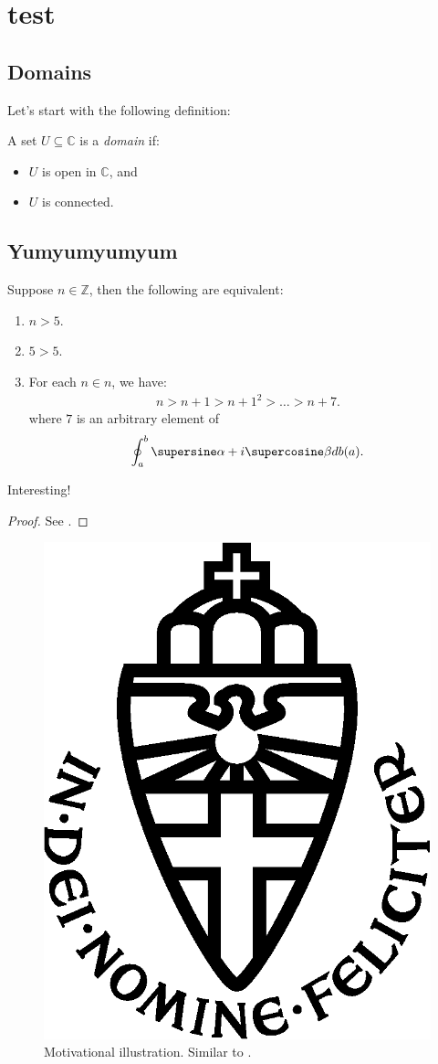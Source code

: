 \chapter{test}
\section{Domains}
Let's start with the following definition:
\begin{definition}\label{def:domain}
	A set $U \subseteq \mathbb{C}$ is a \emph{domain} if:
	\begin{itemize}
		\item $U$ is open in $\mathbb{C}$, and
		\item $U$ is connected.
	\end{itemize}
\end{definition}


\section{Yumyumyumyum}

\begin{theorem}[]
	Suppose $n \in \mathbb{Z}$, then the following are equivalent:
	\begin{enumerate}[label=\roman*.]
		\item $n > 5$.
		\item $5 > 5$.
		\item For each $n \in n$, we have:
		\begin{align}\label{eq:truth}
			n > n+1 > n+1^2 > \dots > n+7.
		\end{align}
		where $7$ is an arbitrary element of
		\begin{align*}
			\oint_{a}^{b} \supersine \alpha + i \supercosine \beta  db(a).
		\end{align*}
	\end{enumerate}
\end{theorem}

\begin{remark}
	Interesting!
\end{remark}
\begin{proof}
	See \cite{NIPS2010_3971}.
\end{proof}

\begin{figure}[h]
	\centering
	\includegraphics[width=.3\textwidth]{img/in_dei_nomine_feliciter.eps}
	\caption{Motivational illustration. Similar to \cite{NIPS2010_3971}.}
	\label{fig:logo}
\end{figure}

